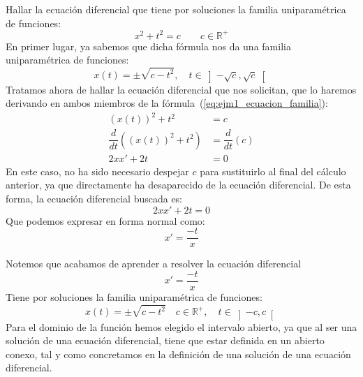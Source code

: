 \begin{ejemplo}
    Hallar la ecuación diferencial que tiene por soluciones la familia uniparamétrica de funciones:
    \begin{equation}\label{eq:ejm1_ecuacion_familia}
        x^2+t^2 = c\qquad c\in \mathbb{R}^+
    \end{equation}
    En primer lugar, ya sabemos que dicha fórmula nos da una familia uniparamétrica de funciones:
    \begin{equation*}
        x(t) = \pm \sqrt{c-t^2}, \quad t\in \left]-\sqrt{c},\sqrt{c}\right[
    \end{equation*}
    Tratamos ahora de hallar la ecuación diferencial que nos solicitan, que lo haremos derivando en ambos miembros de la fórmula~(\ref{eq:ejm1_ecuacion_familia}):
    \begin{align*}
        {(x(t))}^{2}+t^2 &= c \\
        \dfrac{d}{dt}\left({(x(t))}^{2}+t^2 \right) &= \dfrac{d}{dt}(c) \\
        2xx' + 2t &= 0
    \end{align*}
    En este caso, no ha sido necesario despejar $c$ para sustituirlo al final del cálculo anterior, ya que directamente ha desaparecido de la ecuación diferencial. De esta forma, la ecuación diferencial buscada es:
    \begin{equation*}
        2xx' + 2t = 0
    \end{equation*}
    Que podemos expresar en forma normal como:
    \begin{equation*}
        x' = \dfrac{-t}{x}
    \end{equation*}
\end{ejemplo}

\begin{observacion}\label{obs:3a_ec_dif}
    Notemos que acabamos de aprender a resolver la ecuación diferencial
    \begin{equation*}
        x' = \dfrac{-t}{x}
    \end{equation*}
    Tiene por soluciones la familia uniparamétrica de funciones:
    \begin{equation*}
        x(t) = \pm \sqrt{c-t^2} \quad c\in \mathbb{R}^+, \quad t\in \left]-c,c\right[
    \end{equation*}
    Para el dominio de la función hemos elegido el intervalo abierto, ya que al ser una solución de una ecuación diferencial, tiene que estar definida en un abierto conexo, tal y como concretamos en la definición de una solución de una ecuación diferencial.
\end{observacion}


